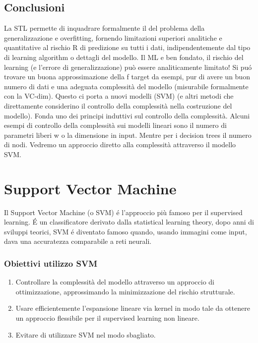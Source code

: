 \documentclass{article}
\begin{document}
\subsection{Conclusioni}
La STL permette di inquadrare formalmente il del problema della generalizzazione e overfitting, fornendo limitazioni superiori analitiche e quantitative al rischio R di predizione su tutti i dati, indipendentemente dal tipo di learning algorithm o dettagli del modello. Il ML e ben fondato, il rischio del learning (e l'errore di generalizzazione) può essere analiticamente limitato! Si puó trovare un buona approssimazione della f target da esempi, pur di avere un buon numero di dati e una adeguata complessità del modello (misurabile formalmente con la VC-dim). Questo ci porta a nuovi modelli (SVM) (e altri metodi che direttamente considerino il controllo della complessità nella costruzione del modello). Fonda uno dei principi induttivi sul controllo della complessità. \newline
Alcuni esempi di controllo della complessità sui modelli lineari sono il numero di parametri liberi w o la dimensione in input. Mentre per i decision trees il numero di nodi. Vedremo un approccio diretto alla complessità attraverso il modello SVM.

\section{Support Vector Machine}
Il Support Vector Machine (o SVM) é l'approccio più famoso per il supervised learning. É un classificatore derivato dalla statistical learning theory, dopo anni di sviluppi teorici, SVM é diventato famoso quando, usando immagini come input, dava una accuratezza comparabile a reti neurali.

\subsubsection{Obiettivi utilizzo SVM}
\begin{enumerate}
    \item Controllare la complessità del modello attraverso un approccio di ottimizzazione, approssimando la minimizzazione del rischio strutturale.
    \item Usare efficientemente l'espansione lineare via kernel in modo tale da ottenere un approccio flessibile per il supervised learning non lineare.
    \item Evitare di utilizzare SVM nel modo sbagliato.
\end{enumerate}
\end{document}
